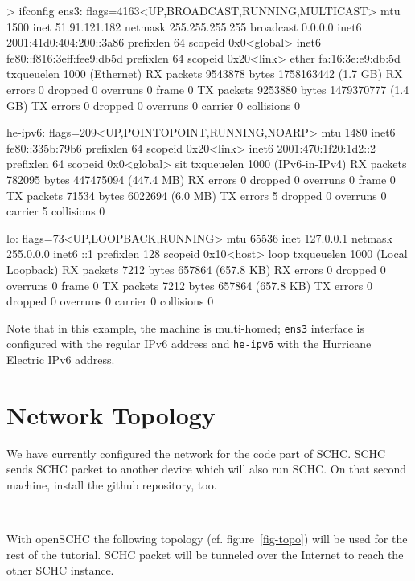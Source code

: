 \begin{termc}[backgroundcolor=\color{palerod}, basicstyle=\ttfamily\tiny, escapechar=@]
> ifconfig
ens3: flags=4163<UP,BROADCAST,RUNNING,MULTICAST>  mtu 1500
        inet 51.91.121.182  netmask 255.255.255.255  broadcast 0.0.0.0
        inet6 2001:41d0:404:200::3a86  prefixlen 64  scopeid 0x0<global>
        inet6 fe80::f816:3eff:fee9:db5d  prefixlen 64  scopeid 0x20<link>
        ether fa:16:3e:e9:db:5d  txqueuelen 1000  (Ethernet)
        RX packets 9543878  bytes 1758163442 (1.7 GB)
        RX errors 0  dropped 0  overruns 0  frame 0
        TX packets 9253880  bytes 1479370777 (1.4 GB)
        TX errors 0  dropped 0 overruns 0  carrier 0  collisions 0

he-ipv6: flags=209<UP,POINTOPOINT,RUNNING,NOARP>  mtu 1480
        inet6 fe80::335b:79b6  prefixlen 64  scopeid 0x20<link>
        inet6 2001:470:1f20:1d2::2  prefixlen 64  scopeid 0x0<global>
        sit  txqueuelen 1000  (IPv6-in-IPv4)
        RX packets 782095  bytes 447475094 (447.4 MB)
        RX errors 0  dropped 0  overruns 0  frame 0
        TX packets 71534  bytes 6022694 (6.0 MB)
        TX errors 5  dropped 0 overruns 0  carrier 5  collisions 0

lo: flags=73<UP,LOOPBACK,RUNNING>  mtu 65536
        inet 127.0.0.1  netmask 255.0.0.0
        inet6 ::1  prefixlen 128  scopeid 0x10<host>
        loop  txqueuelen 1000  (Local Loopback)
        RX packets 7212  bytes 657864 (657.8 KB)
        RX errors 0  dropped 0  overruns 0  frame 0
        TX packets 7212  bytes 657864 (657.8 KB)
        TX errors 0  dropped 0 overruns 0  carrier 0  collisions 0
\end{termc}

Note that in this example, the machine is multi-homed; \texttt{ens3} interface is configured with the regular IPv6 address and \texttt{he-ipv6} with the Hurricane Electric IPv6 address. 

\section{Network Topology}

We have currently configured the network for the code part of SCHC. SCHC sends SCHC packet to another device which will also run SCHC. On that second machine, install the github repository, too.

~

With openSCHC the following topology (cf. figure~\vref{fig-topo}) will be used for the rest of the tutorial. SCHC packet will be tunneled over the Internet to reach the other SCHC instance. 


